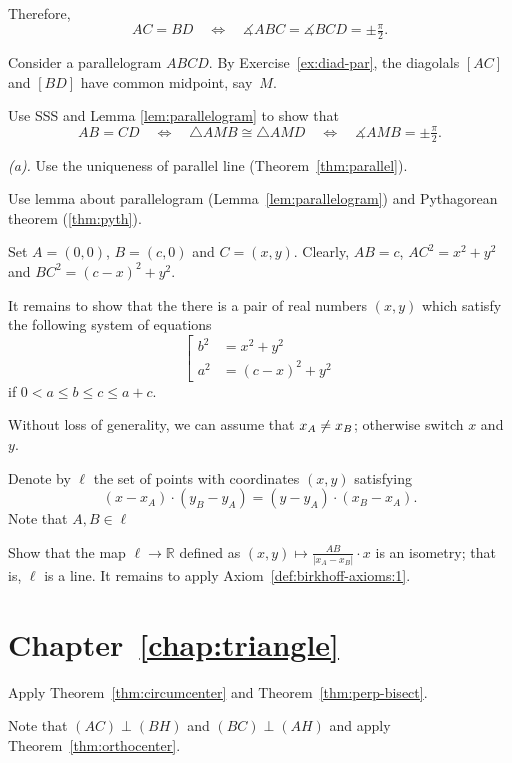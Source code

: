 Therefore, 
\[AC=BD
\quad
\iff
\quad 
\measuredangle ABC
=\measuredangle BCD
=\pm\tfrac\pi2.\]

Consider a parallelogram $ABCD$.
By Exercise~\ref{ex:diad-par},
the diagolals $[AC]$ and $[BD]$ have common midpoint, say~$M$.

Use SSS and Lemma \ref{lem:parallelogram} to show that
\[AB=CD
\quad
\iff
\quad
\triangle AMB
\cong
\triangle AMD
\quad
\iff
\quad
\measuredangle AMB
=
\pm\tfrac\pi2.\]

 \textit{(a).} Use the uniqueness of parallel line (Theorem~\ref{thm:parallel}).

 Use lemma about parallelogram (Lemma~\ref{lem:parallelogram}) and Pythagorean theorem (\ref{thm:pyth}).

Set $A=(0,0)$, $B=(c,0)$ and $C=(x,y)$.
Clearly, $AB=c$,
$AC^2=x^2+y^2$ and $BC^2=(c-x)^2+y^2$.

It remains to show that the there is a pair of real numbers $(x,y)$ 
which satisfy the following system of equations 
$$
\left[
\begin{aligned}
b^2&=x^2+y^2
\\
a^2&=(c-x)^2+y^2
\end{aligned}
\right.
$$
if $0<a\le b\le c\le a+c$.
\qeds

Without loss of generality, we can assume that $x_A\z\ne x_B$;
otherwise switch $x$ and~$y$.

Denote by $\ell$ the set of points with coordinates $(x,y)$ satisfying
\[(x-x_A)\cdot (y_B-y_A)=(y-y_A)\cdot (x_B-x_A).\]
Note that $A, B\in \ell$

Show that the map $\ell\to \mathbb{R}$ defined as
$(x,y)\mapsto \tfrac{AB}{|x_A-x_B|}\cdot x$ is an isometry;
that is, $\ell$ is a line.
It remains to apply Axiom~\ref{def:birkhoff-axioms:1}.


\section*{Chapter~\ref{chap:triangle}}
\setcounter{eqtn}{0}

Apply Theorem~\ref{thm:circumcenter} and Theorem~\ref{thm:perp-bisect}.


Note that $(AC)\perp (BH)$ and $(BC)\perp (AH)$ and apply Theorem~\ref{thm:orthocenter}.


